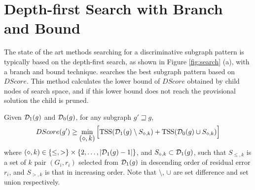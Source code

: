 \section{Depth-first Search with Branch and Bound}
The state of the art methods \cite{Yan:2008, Saigo:2009, Shirakawa:2018} 
searching for a discriminative subgraph pattern is typically based on the depth-first search, 
as shown in Figure \ref{fig:search} (a), with a branch and bound technique.
\cite{Shirakawa:2018} searches the best subgraph pattern based on $DScore$. 
This method calculates the lower bound of $DScore$ obtained by child nodes of search space, 
and if this lower bound does not reach the provisional solution the child is pruned.
\begin{comment}
\begin{theorem}
  \label{thm:bound_C}
  Given $\D_1(g)$ and $\D_0(g)$, for any subgraph $g' \sqsupseteq g$,
  \begin{multline}
    \label{eq:bound_C}
    CScore(g') \leq 
    \max \Big[ 2 \sum_{\{n | y_n=+1, \{G_{n}, y_{n}\} \in D_1(g)\}} y_n - \sum_{n=1}^{N}y_n, 
	-2 \sum_{\{n | y_n=-1, \{G_{n}, y_{n}\} \in D_1(g)\}} y_n + \sum_{n=1}^{N}y_n \Big]
  \end{multline}
\end{theorem}
\end{comment}

\begin{theorem}
  \label{thm:bound_R}
  Given $\mathcal{D}_1(g)$ and $\mathcal{D}_0(g)$, for any subgraph $g' \sqsupseteq g$,
  \begin{multline}
    \label{eq:bound_R}
    DScore(g') \geq 
    \mymin{(\diamond,k)} \Big[ \tss(\D_1(g) \setminus S_{\diamond, k}) + \tss(\D_0(g) \cup S_{\diamond, k}) \Big]
  \end{multline}
  where $ (\diamond, k) \in \{ \leq, > \} \times \{ 2, \dots, |\mathcal{D}_1(g) - 1| \} $,
  and $S_{\diamond, k} \subset \mathcal{D}_1(g)$, such that $S_{\leq, k}$ is
  a set of $k$ pair $(G_i, r_i)$ selected from $\mathcal{D}_1(g)$ in descending order of residual error $r_i$,
  and $S_{>, k}$ is that in increasing order.
  Note that $\setminus$, $\cup$ are set difference and set union respectively.
\end{theorem}

